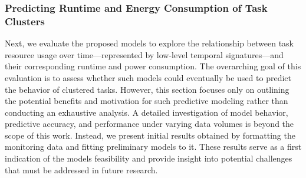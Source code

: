 
\subsubsection{Predicting Runtime and Energy Consumption of Task Clusters}
\label{sec:evaluation_task_cluster_runtime_and_energy_prediction}
Next, we evaluate the proposed models to explore the relationship between task resource usage over time—represented by low-level temporal signatures—and their corresponding runtime and power consumption. The overarching goal of this evaluation is to assess whether such models could eventually be used to predict the behavior of clustered tasks. However, this section focuses only on outlining the potential benefits and motivation for such predictive modeling rather than conducting an exhaustive analysis.
A detailed investigation of model behavior, predictive accuracy, and performance under varying data volumes is beyond the scope of this work. Instead, we present initial results obtained by formatting the monitoring data and fitting preliminary models to it. These results serve as a first indication of the models feasibility and provide insight into potential challenges that must be addressed in future research.

